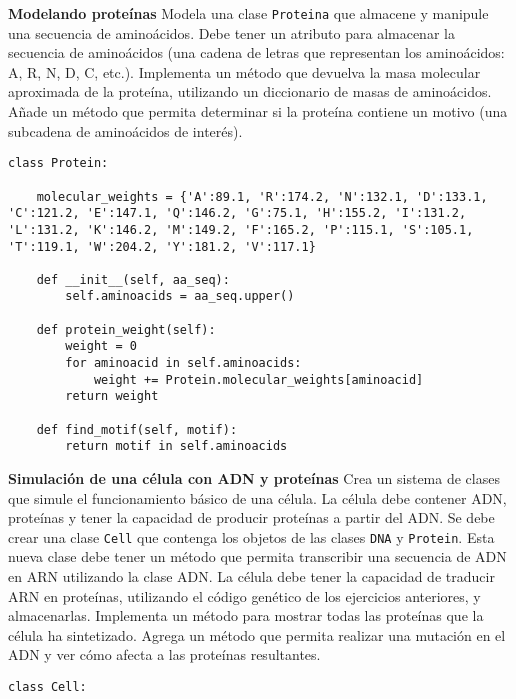 \documentclass{config/ejercicios}
\begin{document}
\begin{problemS} \textbf{Modelando proteínas}
Modela una clase \texttt{Proteina} que almacene y manipule una secuencia de aminoácidos. Debe tener un atributo para almacenar la secuencia de aminoácidos (una cadena de letras que representan los aminoácidos: A, R, N, D, C, etc.). Implementa un método que devuelva la masa molecular aproximada de la proteína, utilizando un diccionario de masas de aminoácidos. Añade un método que permita determinar si la proteína contiene un motivo (una subcadena de aminoácidos de interés).
\begin{lstlisting}
class Protein:

    molecular_weights = {'A':89.1, 'R':174.2, 'N':132.1, 'D':133.1, 'C':121.2, 'E':147.1, 'Q':146.2, 'G':75.1, 'H':155.2, 'I':131.2, 'L':131.2, 'K':146.2, 'M':149.2, 'F':165.2, 'P':115.1, 'S':105.1, 'T':119.1, 'W':204.2, 'Y':181.2, 'V':117.1}

    def __init__(self, aa_seq):
        self.aminoacids = aa_seq.upper()

    def protein_weight(self):
        weight = 0
        for aminoacid in self.aminoacids:
            weight += Protein.molecular_weights[aminoacid]
        return weight

    def find_motif(self, motif):
        return motif in self.aminoacids
\end{lstlisting}
\end{problemS}

\begin{problemS} \textbf{Simulación de una célula con ADN y proteínas}
Crea un sistema de clases que simule el funcionamiento básico de una célula. La célula debe contener ADN, proteínas y tener la capacidad de producir proteínas a partir del ADN.  Se debe crear una clase \texttt{Cell} que contenga los objetos de las clases \texttt{DNA} y \texttt{Protein}. Esta nueva clase debe tener un método que permita transcribir una secuencia de ADN en ARN utilizando la clase ADN. La célula debe tener la capacidad de traducir ARN en proteínas, utilizando el código genético de los ejercicios anteriores, y almacenarlas. Implementa un método para mostrar todas las proteínas que la célula ha sintetizado. Agrega un método que permita realizar una mutación en el ADN y ver cómo afecta a las proteínas resultantes.
\begin{lstlisting}
class Cell:
	
\end{lstlisting}
\end{problemS}
\end{document}
